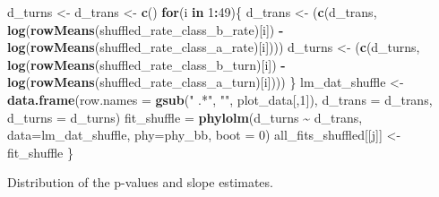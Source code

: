 \documentclass[
]{article}
\newenvironment{Shaded}{\begin{snugshade}}{\end{snugshade}}
\newcommand{\AttributeTok}[1]{\textcolor[rgb]{0.13,0.29,0.53}{#1}}
\newcommand{\ControlFlowTok}[1]{\textcolor[rgb]{0.13,0.29,0.53}{\textbf{#1}}}
\newcommand{\DecValTok}[1]{\textcolor[rgb]{0.00,0.00,0.81}{#1}}
\newcommand{\FunctionTok}[1]{\textcolor[rgb]{0.13,0.29,0.53}{\textbf{#1}}}
\newcommand{\NormalTok}[1]{#1}
\newcommand{\OtherTok}[1]{\textcolor[rgb]{0.56,0.35,0.01}{#1}}
\newcommand{\SpecialCharTok}[1]{\textcolor[rgb]{0.81,0.36,0.00}{\textbf{#1}}}
\newcommand{\StringTok}[1]{\textcolor[rgb]{0.31,0.60,0.02}{#1}}
\begin{document}
\begin{Shaded}
\begin{Highlighting}[]
\NormalTok{  d\_turns }\OtherTok{\textless{}{-}}\NormalTok{ d\_trans }\OtherTok{\textless{}{-}} \FunctionTok{c}\NormalTok{()}
    \ControlFlowTok{for}\NormalTok{(i }\ControlFlowTok{in} \DecValTok{1}\SpecialCharTok{:}\DecValTok{49}\NormalTok{)\{}
\NormalTok{      d\_trans }\OtherTok{\textless{}{-}}\NormalTok{ (}\FunctionTok{c}\NormalTok{(d\_trans, }\FunctionTok{log}\NormalTok{(}\FunctionTok{rowMeans}\NormalTok{(shuffled\_rate\_class\_b\_rate)[i]) }\SpecialCharTok{{-}} 
                      \FunctionTok{log}\NormalTok{(}\FunctionTok{rowMeans}\NormalTok{(shuffled\_rate\_class\_a\_rate)[i])))}
\NormalTok{      d\_turns }\OtherTok{\textless{}{-}}\NormalTok{ (}\FunctionTok{c}\NormalTok{(d\_turns, }\FunctionTok{log}\NormalTok{(}\FunctionTok{rowMeans}\NormalTok{(shuffled\_rate\_class\_b\_turn)[i]) }\SpecialCharTok{{-}} 
                      \FunctionTok{log}\NormalTok{(}\FunctionTok{rowMeans}\NormalTok{(shuffled\_rate\_class\_a\_turn)[i])))}
\NormalTok{    \}}
\NormalTok{  lm\_dat\_shuffle }\OtherTok{\textless{}{-}} \FunctionTok{data.frame}\NormalTok{(}\AttributeTok{row.names =} \FunctionTok{gsub}\NormalTok{(}\StringTok{" .*"}\NormalTok{, }\StringTok{""}\NormalTok{, plot\_data[,}\DecValTok{1}\NormalTok{]),}
                       \AttributeTok{d\_trans =}\NormalTok{ d\_trans,}
                       \AttributeTok{d\_turns =}\NormalTok{ d\_turns)}
\NormalTok{  fit\_shuffle }\OtherTok{=} \FunctionTok{phylolm}\NormalTok{(d\_turns }\SpecialCharTok{\textasciitilde{}}\NormalTok{ d\_trans, }\AttributeTok{data=}\NormalTok{lm\_dat\_shuffle, }\AttributeTok{phy=}\NormalTok{phy\_bb, }\AttributeTok{boot =} \DecValTok{0}\NormalTok{)}
\NormalTok{  all\_fits\_shuffled[[j]] }\OtherTok{\textless{}{-}}\NormalTok{ fit\_shuffle}
\NormalTok{\}}
\end{Highlighting}
\end{Shaded}

Distribution of the p-values and slope estimates.

\begin{Shaded}
\end{Shaded}
\end{document}
